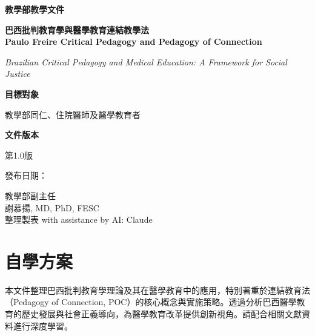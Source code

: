 \documentclass[12pt,a4paper]{article}
\newcommand{\mydate}{\DTMtoday}
\begin{document}
\begin{titlepage}
    \centering
    {\LARGE\textcolor{brazil_green}{\textbf{教學部教學文件}}\par}
    \vspace{1cm}
    {\huge\bfseries 巴西批判教育學與醫學教育連結教學法\\Paulo Freire Critical Pedagogy and Pedagogy of Connection\par}
    \vspace{0.5cm}
    {\Large\textcolor{brazil_blue}{\textit{Brazilian Critical Pedagogy and Medical Education: A Framework for Social Justice}}\par}
    \vspace{1cm}
    
    \begin{tcolorbox}[
        colback=brazil_blue!5!white,
        colframe=brazil_blue,
        width=0.8\textwidth,
        arc=10pt,
        boxrule=1pt
    ]
    \centering
    {\large\textbf{目標對象}\par}
    \vspace{0.3cm}
    教學部同仁、住院醫師及醫學教育者\par
    \vspace{0.5cm}
    {\large\textbf{文件版本}\par}
    \vspace{0.3cm}
    第1.0版\par
    發布日期：\mydate\par
    \end{tcolorbox}

    \vfill
    
    {\large 教學部副主任\\謝慕揚, MD, PhD, FESC\\
    整理製表 with assistance by AI: Claude\par}
    
    \vspace{0.5cm}
\end{titlepage}

\newpage
\tableofcontents
\newpage

\section{自學方案}
本文件整理巴西批判教育學理論及其在醫學教育中的應用，特別著重於連結教育法（Pedagogy of Connection, POC）的核心概念與實施策略。透過分析巴西醫學教育的歷史發展與社會正義導向，為醫學教育改革提供創新視角。請配合相關文獻資料進行深度學習。
\end{document}
